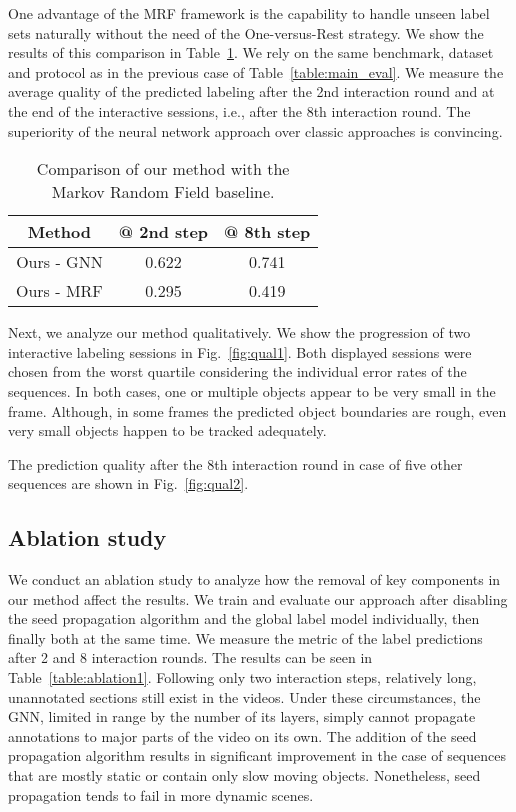 \documentclass[conference]{IEEEtran}
\begin{document}
One advantage of the MRF framework is the capability to handle unseen label sets naturally without the need of the One-versus-Rest strategy. We show the results of this comparison in Table~\ref{table:mrf}. We rely on the same benchmark, dataset and protocol as in the previous case of Table~\ref{table:main_eval}. We measure the average quality of the predicted labeling after the 2nd interaction round and at the end of the interactive sessions, i.e., after the 8th interaction round. The superiority of the neural network approach over classic approaches is convincing.


\begin{table}[htbp]
\caption{Comparison of our method with the Markov Random Field baseline.}
\begin{center}
\begin{tabular}{|c|c|c|}
\hline
\textbf{Method} & \textbf{ @ 2nd step} & \textbf{ @ 8th step} \\
\hline
Ours - GNN & 0.622 & 0.741 \\
\hline
Ours - MRF & 0.295 & 0.419 \\
\hline
\end{tabular}
\end{center}
\label{table:mrf}
\end{table} 
Next, we analyze our method qualitatively. We show the progression of two interactive labeling sessions in Fig.~\ref{fig:qual1}. Both displayed sessions were chosen from the worst quartile considering the individual error rates of the sequences. In both cases, one or multiple objects appear to be very small in the frame. Although, in some frames the predicted object boundaries are rough, even very small objects happen to be tracked adequately.

The prediction quality after the 8th interaction round in case of five other sequences are shown in Fig.~\ref{fig:qual2}.

\subsection{Ablation study}

We conduct an ablation study to analyze how the removal of key components in our method affect the results. We train and evaluate our approach after disabling the seed propagation algorithm and the global label model individually, then finally both at the same time. We measure the  metric of the label predictions after 2 and 8 interaction rounds. The results can be seen in Table~\ref{table:ablation1}. Following only two interaction steps, relatively long, unannotated sections still exist in the videos. Under these circumstances, the GNN, limited in range by the number of its layers, simply cannot propagate annotations to major parts of the video on its own. The addition of the seed propagation algorithm results in significant improvement in the case of sequences that are mostly static or contain only slow moving objects. Nonetheless, seed propagation tends to fail in more dynamic scenes. 
\end{document}
